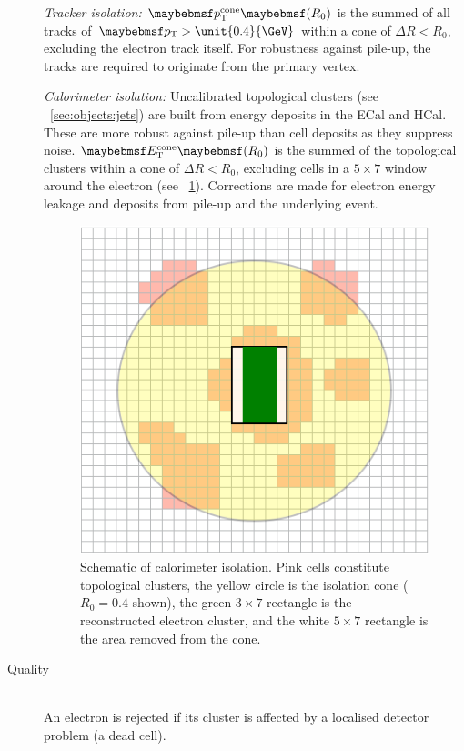 \begin{description}
	\textit{Tracker isolation:} $\ptcone{R_0}$ is the summed \pt of all tracks of 
	$\pt > \unit{0.4}{\GeV}$ within a cone of $\Delta R < R_0$, excluding the electron 
	track itself. For robustness against pile-up, the tracks are required to originate 
	from the primary vertex.

	\textit{Calorimeter isolation:} Uncalibrated topological clusters (see 
	\Section~\ref{sec:objects:jets}) are built from energy deposits in the ECal 
	and HCal. These are more robust against pile-up than cell deposits as they 
	suppress noise. $\etcone{R_0}$ is the summed \et of the topological clusters within a 
	cone of $\Delta R < R_0$, excluding cells in a $5 \times 7$ window around the 
	electron (see \Figure~\ref{fig:objects:el_iso}). Corrections are made for electron 
	energy leakage and deposits from pile-up and the underlying event.

	\begin{figure}[t]
		\includegraphics[width=0.8\smallfigwidth]{tex/selection/el_isolation}
		\caption{Schematic of calorimeter isolation. Pink cells constitute topological 
		clusters, the yellow circle is the isolation cone ($R_0 = 0.4$ shown), the green 
		$3 \times 7$ rectangle is the reconstructed electron cluster, and the white 
		$5 \times 7$ rectangle is the area removed from the cone.}
		\label{fig:objects:el_iso}
	\end{figure}

\item[Quality] \hfill \\
	An electron is rejected if its cluster is affected by a localised detector problem 
	(\eg a dead cell).


\end{description}

